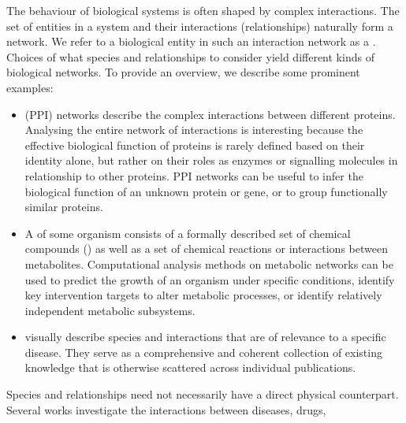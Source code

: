 \documentclass[
	fontsize=10pt, %
	twoside=false, %
	secnumdepth=1, %
  toc=indentunnumbered %
]{kaobook}
\begin{document}
The behaviour of biological systems is often shaped by complex interactions.
%
%
%
The set of entities in a system and their interactions (relationships) naturally
form a network. We refer to a biological entity in such an interaction network
as a . Choices of what species and relationships to consider yield
different kinds of biological networks. To provide an overview, we describe some
prominent examples:
\begin{itemize}
\item {} (PPI) networks describe the complex
  interactions between different proteins. Analysing the entire network of
  interactions is interesting because the effective biological function of
  proteins is rarely defined based on their identity alone, but rather on their
  roles as enzymes or signalling molecules in relationship to other proteins.
  \textsc{PPI} networks can be useful to infer the biological function of an
  unknown protein or gene, or to group functionally similar proteins.
\item A  of some organism consists of a formally described
  set of chemical compounds () as well as a set of chemical
  reactions or interactions between metabolites. Computational analysis
  methods on metabolic networks can be used to predict the growth of an organism
  under specific conditions, identify key intervention targets to alter
  metabolic processes, or identify relatively independent metabolic subsystems.
\item {} visually describe species and interactions that are of
  relevance to a specific disease. They serve as a comprehensive and coherent
  collection of existing knowledge that is otherwise scattered across individual
  publications.
\end{itemize}
Species and relationships need not necessarily have a direct physical
counterpart. Several works investigate the interactions between diseases, drugs,
\end{document}
